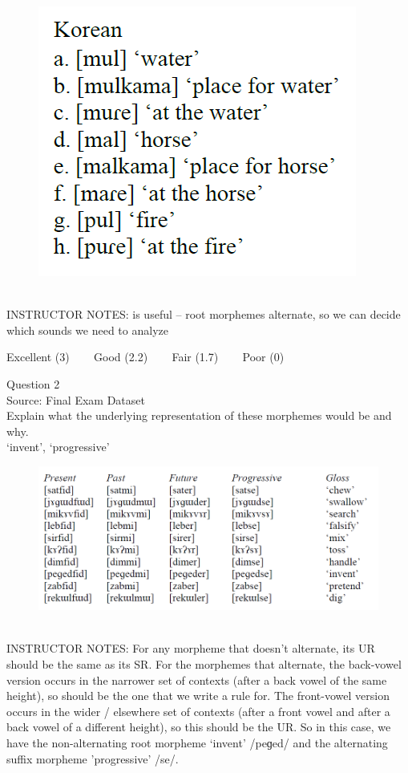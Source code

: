 \documentclass[12pt]{article}
\begin{document}
\begin{figure}[H]
\includegraphics{../images/korean.png}
\end{figure}

~\\
INSTRUCTOR NOTES: is useful -- root morphemes alternate, so we can decide which sounds we need to analyze


\vfill
Excellent (3) ~~~ Good (2.2) ~~~ Fair (1.7) ~~~ Poor (0)
\newpage

{\large Question 2}\\

Source: Final Exam Dataset\\

Explain what the underlying representation of these morphemes would be and why.\\

`invent', `progressive'

\begin{figure}[H]
\includegraphics{../images/final_dataset.png}
\end{figure}

~\\
INSTRUCTOR NOTES: For any morpheme that doesn’t alternate, its UR should be the same as its SR.  For the morphemes that alternate, the back-vowel version occurs in the narrower set of contexts (after a back vowel of the same height), so should be the one that we write a rule for. The front-vowel version occurs in the wider / elsewhere set of contexts (after a front vowel and after a back vowel of a different height), so this should be the UR. So in this case, we have the non-alternating root morpheme ‘invent’ /peɡed/ and the alternating suffix morpheme 'progressive' /se/.
\end{document}
